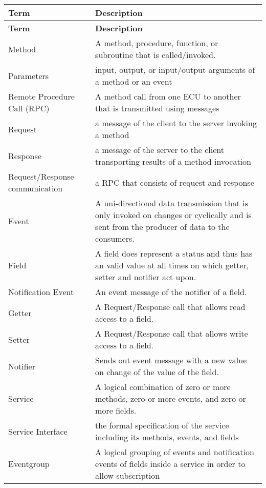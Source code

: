 \tabulinesep=1mm
\begin{longtabu} spread 0pt [c]{*{2}{|X[-1]}|}
\hline
\rowcolor{\tableheadbgcolor}\textbf{ Term }&\textbf{ Description  }\\
\endfirsthead
\hline
\endfoot
\hline
\rowcolor{\tableheadbgcolor}\textbf{ Term }&\textbf{ Description  }\\
\endhead
Method &A method, procedure, function, or subroutine that is called/invoked. \\
Parameters &input, output, or input/output arguments of a method or an event \\
Remote Procedure Call (R\+PC) &A method call from one E\+CU to another that is transmitted using messages \\
Request &a message of the client to the server invoking a method \\
Response &a message of the server to the client transporting results of a method invocation \\
Request/\+Response communication &a R\+PC that consists of request and response \\
Event &A uni-\/directional data transmission that is only invoked on changes or cyclically and is sent from the producer of data to the consumers. \\
Field &A field does represent a status and thus has an valid value at all times on which getter, setter and notifier act upon. \\
Notification Event &An event message of the notifier of a field. \\
Getter &A Request/\+Response call that allows read access to a field. \\
Setter &A Request/\+Response call that allows write access to a field. \\
Notifier &Sends out event message with a new value on change of the value of the field. \\
Service &A logical combination of zero or more methods, zero or more events, and zero or more fields. \\
Service Interface &the formal specification of the service including its methods, events, and fields \\
Eventgroup &A logical grouping of events and notification events of fields inside a service in order to allow subscription \\

\end{longtabu}
